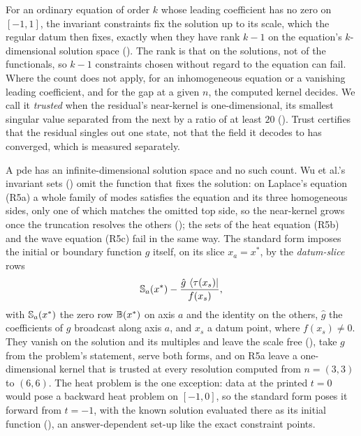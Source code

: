 For an ordinary equation of order $k$ whose leading coefficient has no zero on $[-1,1]$, the invariant constraints fix the solution up to its scale, which the regular datum then fixes, exactly when they have rank $k-1$ on the equation's $k$-dimensional solution space (). The rank is that on the solutions, not of the functionals, so $k-1$ constraints chosen without regard to the equation can fail. Where the count does not apply, for an inhomogeneous equation or a vanishing leading coefficient, and for the gap at a given $n$, the computed kernel decides. We call it \emph{trusted} when the residual's near-kernel is one-dimensional, its smallest singular value separated from the next by a ratio of at least $20$ (). Trust certifies that the residual singles out one state, not that the field it decodes to has converged, which is measured separately.

A \gls{pde} has an infinite-dimensional solution space and no such count. Wu et al.'s invariant sets () omit the function that fixes the solution: on Laplace's equation (R5a) a whole family of modes satisfies the equation and its three homogeneous sides, only one of which matches the omitted top side, so the near-kernel grows once the truncation resolves the others (); the sets of the heat equation (R5b) and the wave equation (R5c) fail in the same way. The standard form imposes the initial or boundary function $g$ itself, on its slice $x_a=x^*$, by the \emph{datum-slice} rows
\begin{equation}
    \mathbb{S}_a(x^*)-\frac{\hat g\,\bra{\tau(x_s)}}{f(x_s)},
    \label{eq:datum-slice}
\end{equation}
with $\mathbb{S}_a(x^*)$ the zero row $\mathbb{B}(x^*)$ on axis $a$ and the identity on the others, $\hat g$ the coefficients of $g$ broadcast along axis $a$, and $x_s$ a datum point, where $f(x_s)\ne0$. They vanish on the solution and its multiples and leave the scale free (), take $g$ from the problem's statement, serve both forms, and on R5a leave a one-dimensional kernel that is trusted at every resolution computed from $n=(3,3)$ to $(6,6)$. The heat problem is the one exception: data at the printed $t=0$ would pose a backward heat problem on $[-1,0]$, so the standard form poses it forward from $t=-1$, with the known solution evaluated there as its initial function (), an answer-dependent set-up like the exact constraint points.

